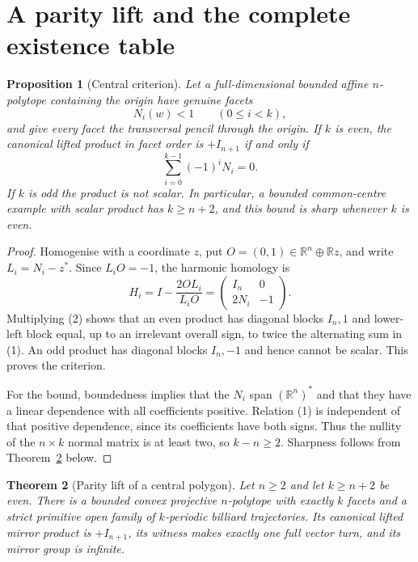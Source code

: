 \documentclass[11pt,a4paper]{article}
\theoremstyle{plain}
\newtheorem{theorem}{Theorem}[section]
\newtheorem{proposition}[theorem]{Proposition}
\theoremstyle{definition}
\theoremstyle{remark}
\begin{document}
\section{A parity lift and the complete existence table}
\begin{proposition}[Central criterion]
\label{prop:common-centre-product}
Let a full-dimensional bounded affine $n$-polytope containing the origin have
genuine facets
\[
                         N_i(w)<1\qquad(0\le i<k),
\]
and give every facet the transversal pencil through the origin.  If $k$ is even,
the canonical lifted product in facet order is $+I_{n+1}$ if and only if
\[
                         \sum_{i=0}^{k-1}(-1)^iN_i=0.       \tag{1}
\]
If $k$ is odd the product is not scalar.  In particular, a bounded common-centre
example with scalar product has $k\ge n+2$, and this bound is sharp whenever $k$
is even.
\end{proposition}

\begin{proof}
Homogenise with a coordinate $z$, put $O=(0,1)\in\mathbb R^n\oplus\mathbb Rz$,
and write $L_i=N_i-z^*$.  Since $L_iO=-1$, the harmonic homology is
\[
 H_i=I-\frac{2OL_i}{L_iO}
    =\begin{pmatrix}I_n&0\\2N_i&-1\end{pmatrix}.           \tag{2}
\]
Multiplying (2) shows that an even product has diagonal blocks $I_n,1$ and
lower-left block equal, up to an irrelevant overall sign, to twice the alternating
sum in (1).  An odd product has diagonal blocks $I_n,-1$ and hence cannot be
scalar.  This proves the criterion.

For the bound, boundedness implies that the $N_i$ span $(\mathbb R^n)^*$ and that
they have a linear dependence with all coefficients positive.  Relation (1) is
independent of that positive dependence, since its coefficients have both signs.
Thus the nullity of the $n\times k$ normal matrix is at least two, so
$k-n\ge2$.  Sharpness follows from Theorem~\ref{thm:parity-lift} below.
\end{proof}

\begin{theorem}[Parity lift of a central polygon]
\label{thm:parity-lift}
Let $n\ge2$ and let $k\ge n+2$ be even.  There is a bounded convex projective
$n$-polytope with exactly $k$ facets and a strict primitive open family of
$k$-periodic billiard trajectories.  Its canonical lifted mirror product is
$+I_{n+1}$, its witness makes exactly one full vector turn, and its mirror group
is infinite.
\end{theorem}
\end{document}
